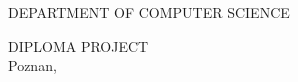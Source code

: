 \documentclass[
    12pt,
    english, %
    singlespacing, %
    oneside, %
]{MastersDoctoralThesis} %
\author{Petro Kolosov, Serhii Holishevskyi, Illia Zubachov, Arslanbek Temirbekov} %
\begin{document}
    \frontmatter %


    \begin{titlepage}
        \begin{center}
            \textsc{DEPARTMENT OF COMPUTER SCIENCE}\\[0.5cm] %

            \vspace{3cm}
            {\huge \bfseries \ttitle\par}
            \vspace{0.4cm}

            \vfill
            \textsc{\Large DIPLOMA PROJECT}\\[0.5cm]


            \vspace*{\fill}
            {\large Poznan, \the\year{}}

        \end{center}
    \end{titlepage}

\end{document}
